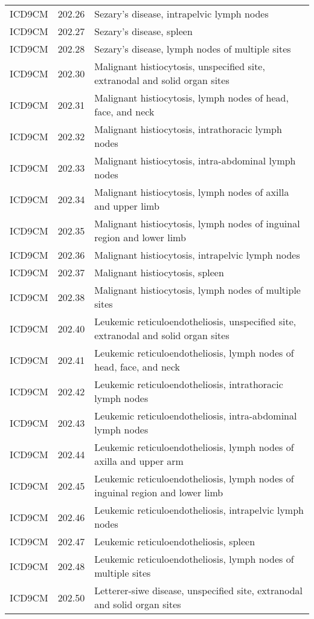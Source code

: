 \begin{longtable}{p{}p{}p{}}
  ICD9CM & 202.26 & Sezary's disease, intrapelvic lymph nodes \\ 
  ICD9CM & 202.27 & Sezary's disease, spleen \\ 
  ICD9CM & 202.28 & Sezary's disease, lymph nodes of multiple sites \\ 
  ICD9CM & 202.30 & Malignant histiocytosis, unspecified site, extranodal and solid organ sites \\ 
  ICD9CM & 202.31 & Malignant histiocytosis, lymph nodes of head, face, and neck \\ 
  ICD9CM & 202.32 & Malignant histiocytosis, intrathoracic lymph nodes \\ 
  ICD9CM & 202.33 & Malignant histiocytosis, intra-abdominal lymph nodes \\ 
  ICD9CM & 202.34 & Malignant histiocytosis, lymph nodes of axilla and upper limb \\ 
  ICD9CM & 202.35 & Malignant histiocytosis, lymph nodes of inguinal region and lower limb \\ 
  ICD9CM & 202.36 & Malignant histiocytosis, intrapelvic lymph nodes \\ 
  ICD9CM & 202.37 & Malignant histiocytosis, spleen \\ 
  ICD9CM & 202.38 & Malignant histiocytosis, lymph nodes of multiple sites \\ 
  ICD9CM & 202.40 & Leukemic reticuloendotheliosis, unspecified site, extranodal and solid organ sites \\ 
  ICD9CM & 202.41 & Leukemic reticuloendotheliosis, lymph nodes of head, face, and neck \\ 
  ICD9CM & 202.42 & Leukemic reticuloendotheliosis, intrathoracic lymph nodes \\ 
  ICD9CM & 202.43 & Leukemic reticuloendotheliosis, intra-abdominal lymph nodes \\ 
  ICD9CM & 202.44 & Leukemic reticuloendotheliosis, lymph nodes of axilla and upper arm \\ 
  ICD9CM & 202.45 & Leukemic reticuloendotheliosis, lymph nodes of inguinal region and lower limb \\ 
  ICD9CM & 202.46 & Leukemic reticuloendotheliosis, intrapelvic lymph nodes \\ 
  ICD9CM & 202.47 & Leukemic reticuloendotheliosis, spleen \\ 
  ICD9CM & 202.48 & Leukemic reticuloendotheliosis, lymph nodes of multiple sites \\ 
  ICD9CM & 202.50 & Letterer-siwe disease, unspecified site, extranodal and solid organ sites \\ 

\end{longtable}
